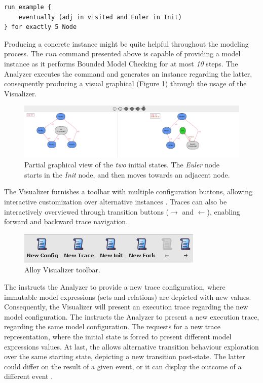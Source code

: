 \begin{lstlisting}[title={Bounded Model Checking: Eventually the graph will represent an \textit{Eulerian} circuit.}, otherkeywords = {run, eventually, in, and, for, exactly, \5, steps}, floatplacement=H]
run example {
    eventually (adj in visited and Euler in Init)
} for exactly 5 Node
\end{lstlisting}

Producing a concrete instance might be quite helpful throughout the modeling process. The $run$ command presented above is capable of providing a model instance as it performs Bounded Model Checking for at most \textit{10} steps. The Analyzer executes the command and generates an instance regarding the latter, consequently producing a visual graphical (Figure \ref{fig:alloy-valid-run}) through the usage of the Visualizer.

\begin{figure}[H]
    \centering
    \includegraphics[width=\linewidth]{img/alloy_run.png}
    \caption{Partial graphical view of the \textit{two} initial states. The \textit{Euler} node starts in the \textit{Init} node, and then moves towards an adjacent node.}
    \label{fig:alloy-valid-run}
\end{figure}

The Visualizer furnishes a toolbar with multiple configuration buttons, allowing interactive customization over alternative instances \cite{alloy-docs}. Traces can also be interactively overviewed through transition buttons ($ \rightarrow $ and $ \leftarrow $), enabling forward and backward trace navigation.

\begin{figure}[H]
    \centering
    \includegraphics[width=0.7\linewidth]{img/alloy_buttons.png}
    \caption{Alloy Visualizer toolbar.}
    \label{fig:alloy-toolbar}
\end{figure}

The  instructs the Analyzer to provide a new trace configuration, where immutable model expressions (sets and relations) are depicted with new values. Consequently, the Visualizer will present an execution trace regarding the new model configuration. The  instructs the Analyzer to present a new execution trace, regarding the same model configuration. The  requests for a new trace representation, where the initial state is forced to present different model expressions values. At last, the  allows alternative transition behaviour exploration over the same starting state, depicting a new transition post-state. The latter could differ on the result of a given event, or it can display the outcome of a different event \cite{alloy-docs}.

